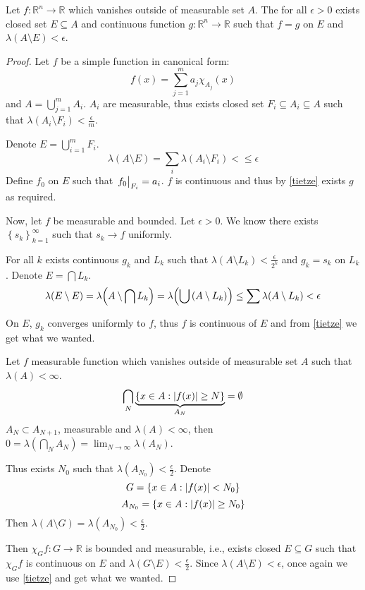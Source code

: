 \begin{theorem}
	Let $f: \mathbb{R}^n \to \mathbb{R}$ which vanishes outside of measurable set $A$. The for all $\epsilon >0$ exists closed set $E\subseteq A$ and continuous function $g: \mathbb{R}^n \to \mathbb{R}$ such that $f=g$ on $E$ and $\lambda(A\setminus E) < \epsilon$.
	\begin{proof}
		Let $f$ be a simple function in canonical form:
		$$f(x) = \sum_{j=1}^m a_j \chi_{A_j}(x)$$
		and $A = \bigcup_{j=1}^m A_i$. $A_i$ are measurable, thus exists closed set $F_i \subseteq A_i \subseteq A$ such that $\lambda(A_i\setminus F_i) < \frac{\epsilon}{m}$.
		
		Denote $E= \bigcup_{i=1}^m F_i$. 
		$$\lambda(A\setminus E) =\sum_i \lambda(A_i\setminus F_i)  < \leq \epsilon$$
		Define $f_0$ on $E$ such that $\eval{f_0}_{F_i}=a_i$. $f$ is continuous and thus by \ref{tietze} exists $g$ as required.
		
		
		Now, let $f$ be measurable and bounded. Let $\epsilon>0$. We know there exists $\left\{ s_k\right\}_{k=1}^\infty$ such that $s_k \to f$ uniformly. 
		
		For all $k$ exists continuous $g_k$ and $L_k$ such that $\lambda(A\setminus L_k) <\frac{\epsilon}{2^k}$ and $g_k=s_k$ on $L_k$. Denote $E = \bigcap L_k$.
		$$\lambda(E\setminus E) = \lambda\qty(A\setminus \bigcap L_k) = \lambda\qty(\bigcup \qty(A\setminus  L_k)) \leq \sum \lambda(A\setminus L_k) < \epsilon$$
		
		On $E$, $g_k$ converges uniformly to $f$, thus $f$ is continuous of $E$ and from \ref{tietze} we get what we wanted.
		
		Let $f$ measurable function which vanishes outside of measurable set $A$ such that $\lambda(A) < \infty$.
		$$\bigcap_N \underbrace{\left\{  x\in A : \abs{f(x)} \geq N \right\}}_{A_N} = \emptyset$$
		$A_N\subset A_{N+1}$, measurable and $\lambda(A) < \infty$, then $0=\lambda(\bigcap_N A_N) = \lim_{N\to \infty} \lambda(A_N)$.
		
		Thus exists $N_0$ such that $\lambda(A_{N_0}) <\frac{\epsilon}{2}$. Denote
		$$G = \left\{ x\in A : \abs{f(x)} < N_0 \right\}$$
		$$A_{N_0} = \left\{ x\in A : \abs{f(x)} \geq N_0 \right\}$$
		Then $\lambda(A\setminus G) =\lambda( A_{N_0} ) < \frac{\epsilon}{2}$.
		
		Then $\chi_G f: G\to \mathbb{R}$ is bounded and measurable, i.e., exists closed $E\subseteq G$ such that $\chi_G f$ is continuous on $E$ and $\lambda(G\setminus E) <\frac{\epsilon}{2}$. Since $\lambda(A\setminus E) < \epsilon$, once again we use \ref{tietze} and get what we wanted. 
		

\end{proof}
\end{theorem}
